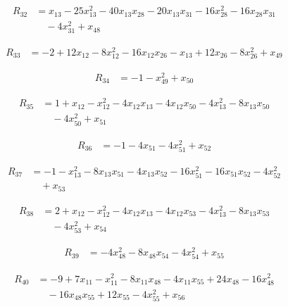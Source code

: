 \begin{align*}
R_{32} &= x_{13} -25 x_{13}^{2} -40 x_{13} x_{28} -20 x_{13} x_{31} -16 x_{28}^{2} -16 x_{28} x_{31} \\
&\quad -4 x_{31}^{2} +x_{48}
\end{align*}

\begin{align*}
R_{33} &= -2 +12 x_{12} -8 x_{12}^{2} -16 x_{12} x_{26} -x_{13} +12 x_{26} -8 x_{26}^{2} +x_{49}
\end{align*}

\begin{align*}
R_{34} &= -1 -x_{49}^{2} +x_{50}
\end{align*}

\begin{align*}
R_{35} &= 1 +x_{12} -x_{12}^{2} -4 x_{12} x_{13} -4 x_{12} x_{50} -4 x_{13}^{2} -8 x_{13} x_{50} \\
&\quad -4 x_{50}^{2} +x_{51}
\end{align*}

\begin{align*}
R_{36} &= -1 -4 x_{51} -4 x_{51}^{2} +x_{52}
\end{align*}

\begin{align*}
R_{37} &= -1 -x_{13}^{2} -8 x_{13} x_{51} -4 x_{13} x_{52} -16 x_{51}^{2} -16 x_{51} x_{52} -4 x_{52}^{2} \\
&\quad +x_{53}
\end{align*}

\begin{align*}
R_{38} &= 2 +x_{12} -x_{12}^{2} -4 x_{12} x_{13} -4 x_{12} x_{53} -4 x_{13}^{2} -8 x_{13} x_{53} \\
&\quad -4 x_{53}^{2} +x_{54}
\end{align*}

\begin{align*}
R_{39} &= -4 x_{48}^{2} -8 x_{48} x_{54} -4 x_{54}^{2} +x_{55}
\end{align*}

\begin{align*}
R_{40} &= -9 +7 x_{11} -x_{11}^{2} -8 x_{11} x_{48} -4 x_{11} x_{55} +24 x_{48} -16 x_{48}^{2} \\
&\quad -16 x_{48} x_{55} +12 x_{55} -4 x_{55}^{2} +x_{56}
\end{align*}

